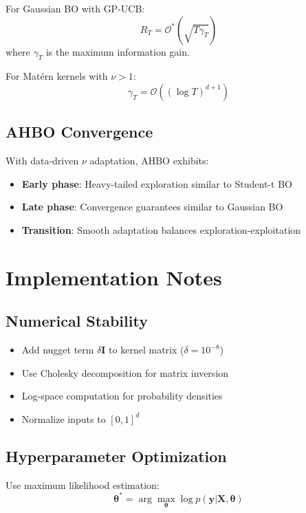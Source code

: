 \documentclass[11pt,a4paper]{article}
\begin{document}
For Gaussian BO with GP-UCB:
\begin{equation}
    R_T = \mathcal{O}^*(\sqrt{T \gamma_T})
\end{equation}
where $\gamma_T$ is the maximum information gain.

For Matérn kernels with $\nu > 1$:
\begin{equation}
    \gamma_T = \mathcal{O}((\log T)^{d+1})
\end{equation}

\subsection{AHBO Convergence}

With data-driven $\nu$ adaptation, AHBO exhibits:
\begin{itemize}
    \item \textbf{Early phase}: Heavy-tailed exploration similar to Student-t BO
    \item \textbf{Late phase}: Convergence guarantees similar to Gaussian BO
    \item \textbf{Transition}: Smooth adaptation balances exploration-exploitation
\end{itemize}

\section{Implementation Notes}

\subsection{Numerical Stability}

\begin{itemize}
    \item Add nugget term $\delta \mathbf{I}$ to kernel matrix ($\delta = 10^{-8}$)
    \item Use Cholesky decomposition for matrix inversion
    \item Log-space computation for probability densities
    \item Normalize inputs to $[0, 1]^d$
\end{itemize}

\subsection{Hyperparameter Optimization}

Use maximum likelihood estimation:
\begin{equation}
    \boldsymbol{\theta}^* = \arg\max_{\boldsymbol{\theta}} \log p(\mathbf{y} | \mathbf{X}, \boldsymbol{\theta})
\end{equation}
\end{document}

